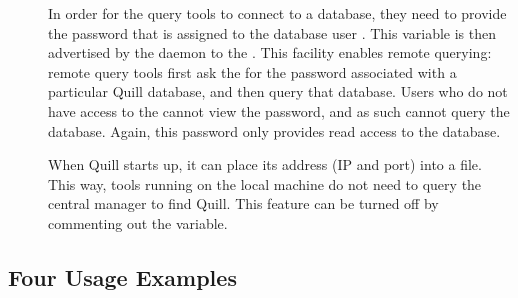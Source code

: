 \begin{description}
\item[]
In order for the query tools to connect to a database, they need to provide
the password that is assigned to the database user . 
This variable is then advertised by the  daemon
to the .  
This facility enables remote querying: remote  query tools first 
ask the  for
the password associated with a particular Quill database, 
and then query that database.  Users who do not have access to the 
cannot view the password, and as such cannot query the database.  Again, this 
password only provides read access to the database.

\item[]
When Quill starts up, it can place its address (IP and port)
into a file.  This way, tools running on the local machine do not
need to query the central manager to find Quill.  This 
feature can be turned off by commenting out the variable.

\end{description}


\subsection{\label{sec:Quill-Example}Four Usage Examples}


